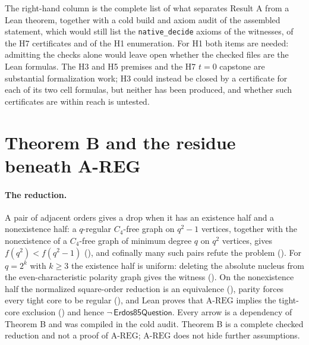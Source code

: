 \documentclass{anvil-paper}
\newcommand{\AREG}{\mathrm{A\text{-}REG}}
\newcommand{\Qn}{\textsf{Erdos85Question}}
\theoremstyle{definition}
\begin{document}
The right-hand column is the complete list of what separates Result A from a Lean theorem, together with a cold build and axiom audit of the assembled statement, which would still list the \texttt{native\_decide} axioms of the witnesses, of the H7 certificates and of the H1 enumeration. For H1 both items are needed: admitting the checks alone would leave open whether the checked files are the Lean formulas. The H3 and H5 premises and the H7 $t=0$ capstone are substantial formalization work; H3 could instead be closed by a certificate for each of its two cell formulas, but neither has been produced, and whether such certificates are within reach is untested.

\section{Theorem B and the residue beneath A-REG}\label{sec:theoremB}

\paragraph{The reduction.} A pair of adjacent orders gives a drop when it has an existence half and a nonexistence half: a $q$-regular $C_4$-free graph on $q^2-1$ vertices, together with the nonexistence of a $C_4$-free graph of minimum degree $q$ on $q^2$ vertices, gives $f(q^2)<f(q^2-1)$ (), and cofinally many such pairs refute the problem (). For $q=2^k$ with $k\ge 3$ the existence half is uniform: deleting the absolute nucleus from the even-characteristic polarity graph gives the witness (). On the nonexistence half the normalized square-order reduction is an equivalence (), parity forces every tight core to be regular (), and Lean proves that $\AREG$ implies the tight-core exclusion () and hence $\neg\,\Qn$. Every arrow is a dependency of Theorem B and was compiled in the cold audit. Theorem B is a complete checked reduction and not a proof of $\AREG$; $\AREG$ does not hide further assumptions.
\end{document}
